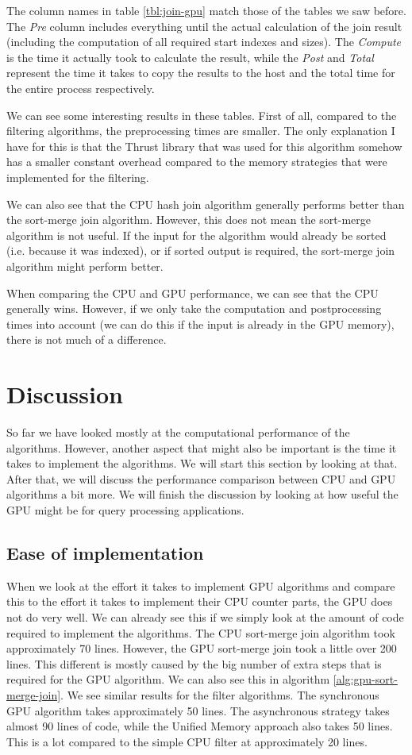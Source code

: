 \documentclass[a4paper,titlepage]{article}
\begin{document}
The column names in table \ref{tbl:join-gpu} match those of the tables we saw before. The \emph{Pre} column includes everything until the actual calculation of the join result (including the computation of all required start indexes and sizes). The \emph{Compute} is the time it actually took to calculate the result, while the \emph{Post} and \emph{Total} represent the time it takes to copy the results to the host and the total time for the entire process respectively.

We can see some interesting results in these tables. First of all, compared to the filtering algorithms, the preprocessing times are smaller. The only explanation I have for this is that the Thrust library that was used for this algorithm somehow has a smaller constant overhead compared to the memory strategies that were implemented for the filtering. 

We can also see that the CPU hash join algorithm generally performs better than the sort-merge join algorithm. However, this does not mean the sort-merge algorithm is not useful. If the input for the algorithm would already be sorted (i.e. because it was indexed), or if sorted output is required, the sort-merge join algorithm might perform better.

When comparing the CPU and GPU performance, we can see that the CPU generally wins. However, if we only take the computation and postprocessing times into account (we can do this if the input is already in the GPU memory), there is not much of a difference.

\section{Discussion}
\label{sec:discussion}
So far we have looked mostly at the computational performance of the algorithms. However, another aspect that might also be important is the time it takes to implement the algorithms. We will start this section by looking at that. After that, we will discuss the performance comparison between CPU and GPU algorithms a bit more. We will finish the discussion by looking at how useful the GPU might be for query processing applications.

\subsection{Ease of implementation}
When we look at the effort it takes to implement GPU algorithms and compare this to the effort it takes to implement their CPU counter parts, the GPU does not do very well. We can already see this if we simply look at the amount of code required to implement the algorithms. The CPU sort-merge join algorithm took approximately 70 lines. However, the GPU sort-merge join took a little over 200 lines. This different is mostly caused by the big number of extra steps that is required for the GPU algorithm. We can also see this in algorithm \ref{alg:gpu-sort-merge-join}. We see similar results for the filter algorithms. The synchronous GPU algorithm takes approximately 50 lines. The asynchronous strategy takes almost 90 lines of code, while the Unified Memory approach also takes 50 lines. This is a lot compared to the simple CPU filter at approximately 20 lines.
\end{document}
